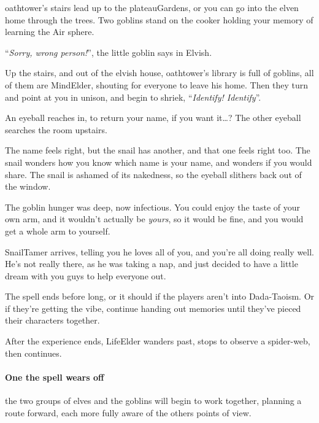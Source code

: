\begin{multicols}{2}
\begin{boxtext}
  \Gls{oathtower}'s stairs lead up to the \gls{plateauGardens}, or you can go into the elven home through the trees.
  Two goblins stand on the cooker holding your memory of learning the Air \gls{sphere}.

    ``\textit{Sorry, wrong person!}'', the little goblin says in Elvish.

\end{boxtext}

\begin{boxtext}
    Up the stairs, and out of the elvish house, \gls{oathtower}'s library is full of goblins, all of them are \gls{MindElder}, shouting for everyone to leave his home.
    Then they turn and point at you in unison, and begin to shriek, ``\textit{Identify! Identify}''.

    An eyeball reaches in, to return your name, if you want it\ldots ?
    The other eyeball searches the room upstairs.

    The name feels right, but the snail has another, and that one feels right too.
    The snail wonders how you know which name is your name, and wonders if you would share.
    The snail is ashamed of its nakedness, so the eyeball slithers back out of the window.

\end{boxtext}

\begin{boxtext}

    The goblin hunger was deep, now infectious.
    You could enjoy the taste of your own arm, and it wouldn't actually be \emph{yours}, so it would be fine, and you would get a whole arm to yourself.

    \Gls{SnailTamer} arrives, telling you he loves all of you, and you're all doing really well.
    He's not really there, as he was taking a nap, and just decided to have a little dream with you guys to help everyone out.
\end{boxtext}

The spell ends before long, or it should if the players aren't into Dada-Taoism.
Or if they're getting the vibe, continue handing out memories until they've pieced their characters together.

After the experience ends, \gls{LifeElder} wanders past, stops to observe a spider-web, then continues.

\paragraph{One the spell wears off}
the two groups of elves and the goblins will begin to work together, planning a route forward, each more fully aware of the others points of view.


\end{multicols}
